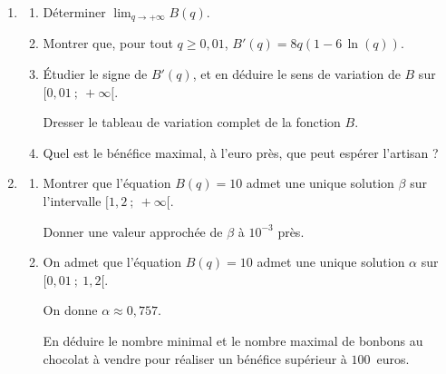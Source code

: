 \documentclass[10pt]{article}
\begin{document}
\begin{enumerate}
\item 
	\begin{enumerate}
		\item Déterminer $\displaystyle\lim_{q \to +\infty}B(q)$.
		\item Montrer que, pour tout $q \geqslant 0,01$,\: $B'(q) = 8q(1 - 6\,\ln (q))$.
		\item Étudier le signe de $B'(q)$, et en déduire le sens de variation de $B$ sur $[0,01~;~+\infty[$.

Dresser le tableau de variation complet de la fonction $B$.
		\item Quel est le bénéfice maximal, à l'euro près, que peut espérer l'artisan ?
	\end{enumerate}
\item 
	\begin{enumerate}
		\item Montrer que l'équation $B(q)= 10$ admet une unique solution $\beta$ sur l'intervalle $[1,2~;~+\infty[$.
		
		Donner une valeur approchée de $\beta$ à $10^{-3}$ près.
		\item On admet que l'équation $B(q)= 10$ admet une unique solution $\alpha$ sur $[0,01~;~1,2[$.
		
On donne $\alpha \approx 0,757$.
		
		En déduire le nombre minimal et le nombre maximal de bonbons au chocolat à vendre pour réaliser un bénéfice supérieur à $100$~euros.
	\end{enumerate}
\end{enumerate}

\bigskip
\end{document}
